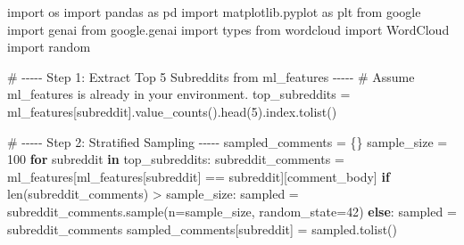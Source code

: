 \documentclass[
  12pt,
  letterpaper,
  DIV=11,
  numbers=noendperiod,
  abstract]{scrartcl}
\newenvironment{Shaded}{\begin{snugshade}}{\end{snugshade}}
\newcommand{\BuiltInTok}[1]{\textcolor[rgb]{0.00,0.23,0.31}{#1}}
\newcommand{\CommentTok}[1]{\textcolor[rgb]{0.37,0.37,0.37}{#1}}
\newcommand{\ControlFlowTok}[1]{\textcolor[rgb]{0.00,0.23,0.31}{\textbf{#1}}}
\newcommand{\DecValTok}[1]{\textcolor[rgb]{0.68,0.00,0.00}{#1}}
\newcommand{\ImportTok}[1]{\textcolor[rgb]{0.00,0.46,0.62}{#1}}
\newcommand{\KeywordTok}[1]{\textcolor[rgb]{0.00,0.23,0.31}{\textbf{#1}}}
\newcommand{\NormalTok}[1]{\textcolor[rgb]{0.00,0.23,0.31}{#1}}
\newcommand{\OperatorTok}[1]{\textcolor[rgb]{0.37,0.37,0.37}{#1}}
\newcommand{\StringTok}[1]{\textcolor[rgb]{0.13,0.47,0.30}{#1}}
\begin{document}
\begin{Shaded}
\begin{Highlighting}[]
\ImportTok{import}\NormalTok{ os}
\ImportTok{import}\NormalTok{ pandas }\ImportTok{as}\NormalTok{ pd}
\ImportTok{import}\NormalTok{ matplotlib.pyplot }\ImportTok{as}\NormalTok{ plt}
\ImportTok{from}\NormalTok{ google }\ImportTok{import}\NormalTok{ genai}
\ImportTok{from}\NormalTok{ google.genai }\ImportTok{import}\NormalTok{ types}
\ImportTok{from}\NormalTok{ wordcloud }\ImportTok{import}\NormalTok{ WordCloud}
\ImportTok{import}\NormalTok{ random}

\CommentTok{\# {-}{-}{-}{-}{-} Step 1: Extract Top 5 Subreddits from ml\_features {-}{-}{-}{-}{-}}
\CommentTok{\# Assume ml\_features is already in your environment.}
\NormalTok{top\_subreddits }\OperatorTok{=}\NormalTok{ ml\_features[}\StringTok{\textquotesingle{}subreddit\textquotesingle{}}\NormalTok{].value\_counts().head(}\DecValTok{5}\NormalTok{).index.tolist()}

\CommentTok{\# {-}{-}{-}{-}{-} Step 2: Stratified Sampling {-}{-}{-}{-}{-} }
\NormalTok{sampled\_comments }\OperatorTok{=}\NormalTok{ \{\}}
\NormalTok{sample\_size }\OperatorTok{=} \DecValTok{100}
\ControlFlowTok{for}\NormalTok{ subreddit }\KeywordTok{in}\NormalTok{ top\_subreddits:}
\NormalTok{    subreddit\_comments }\OperatorTok{=}\NormalTok{ ml\_features[ml\_features[}\StringTok{\textquotesingle{}subreddit\textquotesingle{}}\NormalTok{] }\OperatorTok{==}\NormalTok{ subreddit][}\StringTok{\textquotesingle{}comment\_body\textquotesingle{}}\NormalTok{]}
    \ControlFlowTok{if} \BuiltInTok{len}\NormalTok{(subreddit\_comments) }\OperatorTok{\textgreater{}}\NormalTok{ sample\_size:}
\NormalTok{        sampled }\OperatorTok{=}\NormalTok{ subreddit\_comments.sample(n}\OperatorTok{=}\NormalTok{sample\_size, random\_state}\OperatorTok{=}\DecValTok{42}\NormalTok{)}
    \ControlFlowTok{else}\NormalTok{:}
\NormalTok{        sampled }\OperatorTok{=}\NormalTok{ subreddit\_comments}
\NormalTok{    sampled\_comments[subreddit] }\OperatorTok{=}\NormalTok{ sampled.tolist()}


\end{Highlighting}
\end{Shaded}
\end{document}
